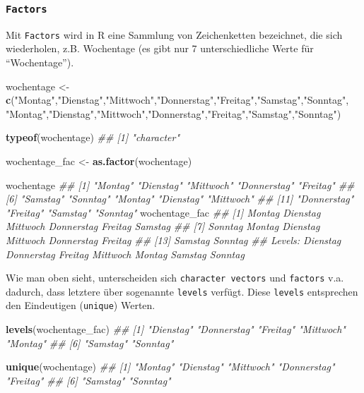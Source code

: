 \documentclass[]{book}
\newenvironment{Shaded}{\begin{snugshade}}{\end{snugshade}}
\newcommand{\CommentTok}[1]{\textcolor[rgb]{0.56,0.35,0.01}{\textit{#1}}}
\newcommand{\KeywordTok}[1]{\textcolor[rgb]{0.13,0.29,0.53}{\textbf{#1}}}
\newcommand{\NormalTok}[1]{#1}
\newcommand{\StringTok}[1]{\textcolor[rgb]{0.31,0.60,0.02}{#1}}
\begin{document}
\hypertarget{factors}{%
\subsubsection{\texorpdfstring{\texttt{Factors}}{Factors}}\label{factors}}

Mit \texttt{Factors} wird in R eine Sammlung von Zeichenketten bezeichnet, die sich wiederholen, z.B. Wochentage (es gibt nur 7 unterschiedliche Werte für ``Wochentage'').

\begin{Shaded}
\begin{Highlighting}[]
\NormalTok{wochentage <-}\StringTok{ }\KeywordTok{c}\NormalTok{(}\StringTok{"Montag"}\NormalTok{,}\StringTok{"Dienstag"}\NormalTok{,}\StringTok{"Mittwoch"}\NormalTok{,}\StringTok{"Donnerstag"}\NormalTok{,}\StringTok{"Freitag"}\NormalTok{,}\StringTok{"Samstag"}\NormalTok{,}\StringTok{"Sonntag"}\NormalTok{,}
                \StringTok{"Montag"}\NormalTok{,}\StringTok{"Dienstag"}\NormalTok{,}\StringTok{"Mittwoch"}\NormalTok{,}\StringTok{"Donnerstag"}\NormalTok{,}\StringTok{"Freitag"}\NormalTok{,}\StringTok{"Samstag"}\NormalTok{,}\StringTok{"Sonntag"}\NormalTok{)}

\KeywordTok{typeof}\NormalTok{(wochentage)}
\CommentTok{## [1] "character"}

\NormalTok{wochentage_fac <-}\StringTok{ }\KeywordTok{as.factor}\NormalTok{(wochentage)}

\NormalTok{wochentage}
\CommentTok{##  [1] "Montag"     "Dienstag"   "Mittwoch"   "Donnerstag" "Freitag"   }
\CommentTok{##  [6] "Samstag"    "Sonntag"    "Montag"     "Dienstag"   "Mittwoch"  }
\CommentTok{## [11] "Donnerstag" "Freitag"    "Samstag"    "Sonntag"}
\NormalTok{wochentage_fac}
\CommentTok{##  [1] Montag     Dienstag   Mittwoch   Donnerstag Freitag    Samstag   }
\CommentTok{##  [7] Sonntag    Montag     Dienstag   Mittwoch   Donnerstag Freitag   }
\CommentTok{## [13] Samstag    Sonntag   }
\CommentTok{## Levels: Dienstag Donnerstag Freitag Mittwoch Montag Samstag Sonntag}
\end{Highlighting}
\end{Shaded}

Wie man oben sieht, unterscheiden sich \texttt{character\ vectors} und \texttt{factors} v.a. dadurch, dass letztere über sogenannte \texttt{levels} verfügt. Diese \texttt{levels} entsprechen den Eindeutigen (\texttt{unique}) Werten.

\begin{Shaded}
\begin{Highlighting}[]
\KeywordTok{levels}\NormalTok{(wochentage_fac)}
\CommentTok{## [1] "Dienstag"   "Donnerstag" "Freitag"    "Mittwoch"   "Montag"    }
\CommentTok{## [6] "Samstag"    "Sonntag"}

\KeywordTok{unique}\NormalTok{(wochentage)}
\CommentTok{## [1] "Montag"     "Dienstag"   "Mittwoch"   "Donnerstag" "Freitag"   }
\CommentTok{## [6] "Samstag"    "Sonntag"}
\end{Highlighting}
\end{Shaded}
\end{document}

